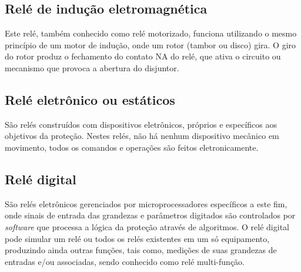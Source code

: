 \documentclass[a5paper,english,spanish,brazil]{ufsc-thesis}
\begin{document}
		\subsection{Relé de indução eletromagnética}
		Este relé, também conhecido como relé motorizado, funciona utilizando o mesmo princípio de um motor de indução, onde um rotor (tambor ou disco) gira. O giro do rotor produz o fechamento do contato NA do relé, que ativa o circuito ou mecanismo que provoca a abertura do disjuntor.\par

		\subsection{Relé eletrônico ou estáticos}
		São relés construídos com dispositivos eletrônicos, próprios e específicos aos objetivos da proteção. Nestes relés, não há nenhum dispositivo mecânico em movimento, todos os comandos e operações são feitos eletronicamente.\par

		\subsection{Relé digital}
		São relés eletrônicos gerenciados por microprocessadores específicos a este fim, onde sinais de entrada das grandezas e parâmetros digitados são controlados por \textit{software} que processa a lógica da proteção através de algoritmos. O relé digital pode simular um relé ou todos os relés existentes em um só equipamento, produzindo ainda outras funções, tais como, medições de suas grandezas de entradas e/ou associadas, sendo conhecido como relé multi-função.\par
\end{document}
